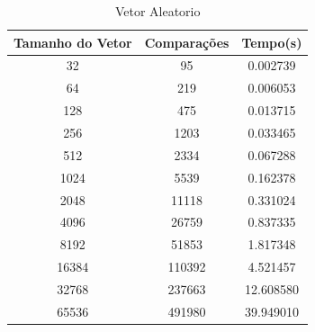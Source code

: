 \documentclass[12pt,a4paper,twoside]{report}
\begin{document}
\begin{table}[h]
  \centering
  \caption{Vetor Aleatorio \label{tab:aleatorio}}
  \begin{tabular}{ccc} \\\hline
  \textbf{Tamanho do Vetor} & \textbf{Comparações} & \textbf{Tempo(s)} \\\hline
  32                        & 95                   & 0.002739          \\\hline
  64                        & 219                  & 0.006053          \\\hline
  128                       & 475                  & 0.013715          \\\hline
  256                       & 1203                 & 0.033465          \\\hline
  512                       & 2334                 & 0.067288          \\\hline
  1024                      & 5539                 & 0.162378          \\\hline
  2048                      & 11118                & 0.331024          \\\hline
  4096                      & 26759                & 0.837335         \\\hline
  8192                      & 51853                & 1.817348        \\\hline
  16384                     & 110392               & 4.521457        \\\hline
  32768                     & 237663               & 12.608580        \\\hline
  65536                     & 491980               & 39.949010        \\\hline
  \end{tabular}
\end{table}
\end{document}
